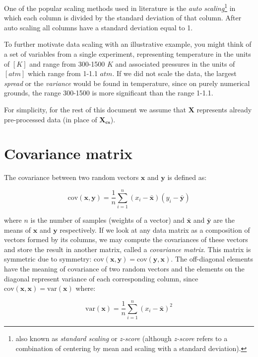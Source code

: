 \documentclass[10pt,twocolumn]{article}
\begin{document}
One of the popular scaling methods used in literature is the \textit{auto scaling}\footnote{also known as \textit{standard scaling} or \textit{z-score} (although \textit{z-score} refers to a combination of centering by mean and scaling with a standard deviation).} in which each column is divided by the standard deviation of that column. After auto scaling all columns have a standard deviation equal to 1.

To further motivate data scaling with an illustrative example, you might think of a set of variables from a single experiment, representing temperature in the units of $[K]$ and range from 300-1500 $K$ and associated pressures in the units of $[atm]$ which range from 1-1.1 $atm$. If we did not scale the data, the largest \textit{spread} or the \textit{variance} would be found in temperature, since on purely numerical grounds, the range 300-1500 is more significant than the range 1-1.1.

For simplicity, for the rest of this document we assume that $\mathbf{X}$ represents already pre-processed data (in place of $\mathbf{X_{cs}}$).

\section{Covariance matrix}

The covariance between two random vectors $\mathbf{x}$ and $\mathbf{y}$ is defined as:

\begin{equation}\label{eq:covariance-definition}
\text{cov}(\mathbf{x},\mathbf{y}) = \frac{1}{n} \sum_{i=1}^{n} (x_i - \bar{\mathbf{x}}) (y_i - \bar{\mathbf{y}})
\end{equation}

where $n$ is the number of samples (weights of a vector) and $\bar{\mathbf{x}}$ and $\bar{\mathbf{y}}$ are the means of $\mathbf{x}$ and $\mathbf{y}$ respectively. If we look at any data matrix as a composition of vectors formed by its columns, we may compute the covariances of these vectors and store the result in another matrix, called a \textit{covariance matrix}. This matrix is symmetric due to symmetry: $\text{cov}(\mathbf{x},\mathbf{y}) = \text{cov}(\mathbf{y},\mathbf{x})$. The off-diagonal elements have the meaning of covariance of two random vectors and the elements on the diagonal represent variance of each corresponding column, since $\text{cov}(\mathbf{x},\mathbf{x}) = \text{var}(\mathbf{x})$ where:

\begin{equation}\label{eq:variance-definition}
\text{var}(\mathbf{x}) = \frac{1}{n} \sum_{i=1}^{n} (x_i - \bar{\mathbf{x}})^2
\end{equation}
\end{document}
